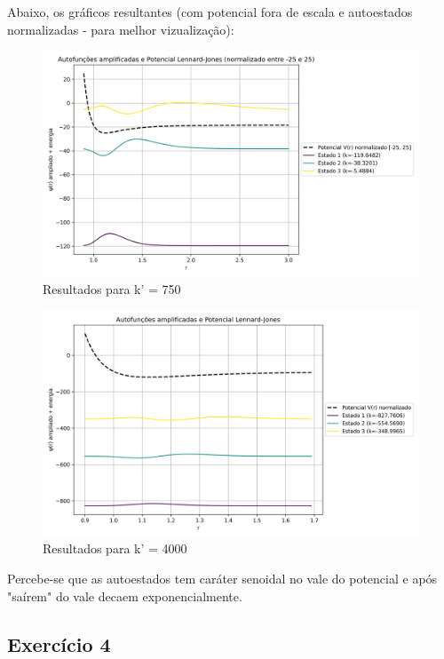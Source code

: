 \documentclass[12pt, a4paper]{article} %
\begin{document}
            Abaixo, os gr\'aficos resultantes (com potencial fora de escala e autoestados normalizadas - para melhor vizualiza\c{c}\~ao):
            \begin{figure}[H]
                \centering
                \includegraphics[scale=0.7]{../images/ex3-results-750.png}
                \caption{Resultados para k' = 750}
                \label{fig:nao-harmonico}
            \end{figure}
            \begin{figure}[H]
                \centering
                \includegraphics[scale=0.7]{../images/ex3-results-4000.png}
                \caption{Resultados para k' = 4000}
                \label{fig:harmonico}
            \end{figure}

            Percebe-se que as autoestados tem car\'ater senoidal no vale do potencial e ap\'os "sa\'irem" do vale decaem exponencialmente.

        \subsection{Exerc\'icio 4}
\end{document}
